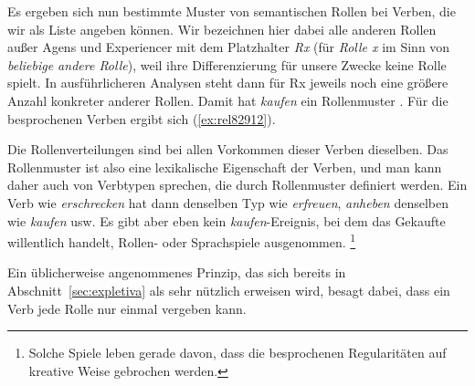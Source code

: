 

Es ergeben sich nun bestimmte Muster von semantischen Rollen bei Verben, die wir als Liste angeben können.
Wir bezeichnen hier dabei alle anderen Rollen außer Agens und Experiencer mit dem Platzhalter \textit{Rx} (für \textit{Rolle x} im Sinn von \textit{beliebige andere Rolle}), weil ihre Differenzierung für unsere Zwecke keine Rolle spielt.
In ausführlicheren Analysen steht dann für Rx jeweils noch eine größere Anzahl konkreter anderer Rollen.
Damit hat \zB \textit{kaufen} ein Rollenmuster .
Für die besprochenen Verben ergibt sich (\ref{ex:rel82912}).

\begin{exe}
  \ex\label{ex:rel82912}
  \begin{xlist}
  \end{xlist}
\end{exe}

Die Rollenverteilungen sind bei allen Vorkommen dieser Verben dieselben.
Das Rollenmuster ist also eine lexikalische Eigenschaft der Verben, und man kann daher auch von Verbtypen sprechen, die durch Rollenmuster definiert werden.
Ein Verb wie \textit{erschrecken} hat dann denselben Typ wie \textit{erfreuen}, \textit{anheben} denselben wie \textit{kaufen} usw.
Es gibt aber eben kein \textit{kaufen}-Ereignis, bei dem das Gekaufte willentlich handelt, Rollen- oder Sprachspiele ausgenommen.%
\footnote{Solche Spiele leben gerade davon, dass die besprochenen Regularitäten auf kreative Weise gebrochen werden.}

Ein üblicherweise angenommenes Prinzip, das sich bereits in Abschnitt~\ref{sec:expletiva} als sehr nützlich erweisen wird, besagt dabei, dass ein Verb jede Rolle nur einmal vergeben kann.


